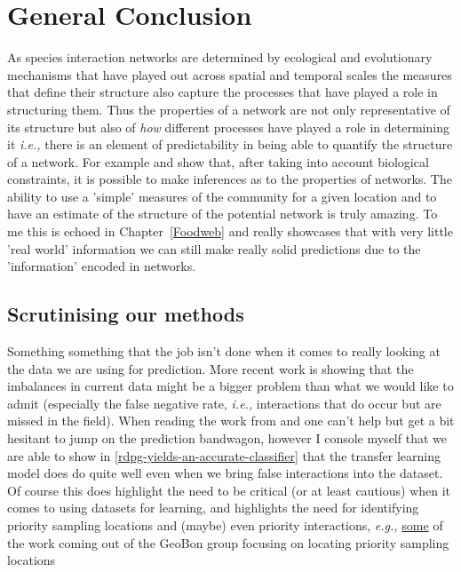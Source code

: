 \anglais
\chapter{General Conclusion}\label{Conclusion}

As species interaction networks are determined by ecological and
evolutionary mechanisms that have played out across spatial and temporal
scales the measures that define their structure also capture the
processes that have played a role in structuring them. Thus the
properties of a network are not only representative of its structure but
also of \emph{how} different processes have played a role in determining
it \emph{i.e.,} there is an element of predictability in being able to
quantify the structure of a network. For example \cite{MacDonald2020RevLin}
and \cite{Banville2023What} show that, after taking into account biological constraints, it is possible to make inferences as to the properties of networks. The ability to use a 'simple' measures of the community for a given location and to have an estimate of the structure of the potential network is truly
amazing. To me this is echoed in Chapter~\ref{Foodweb} and really showcases that
with very little 'real world' information we can still make really solid
predictions due to the 'information' encoded in networks.

\section{Scrutinising our methods}

Something something that the job isn't done when it comes to really looking at the data we are using for prediction. More recent work is showing that the imbalances in current data might be a bigger problem than what we would like to admit (especially the false negative rate, \emph{i.e.,} interactions that do occur but are missed in the field). When reading the work from \cite{Poisot2023Guidelines} and \cite{Catchen2023Missing} one can't help but get a bit hesitant to jump on the prediction bandwagon, however I console myself that we are able to show in \autoref{rdpg-yields-an-accurate-classifier} that the transfer learning model does do quite well even when we bring false interactions into the dataset. Of course this does highlight the need to be critical (or at least cautious) when it comes to using datasets for learning, and highlights the need for identifying priority sampling locations and (maybe) even priority interactions, \emph{e.g.,} \href{https://github.com/EcoJulia/BiodiversityObservationNetworks.jl/tree/main}{some} of the work coming out of the GeoBon group
focusing on locating priority sampling locations 

